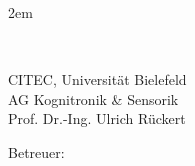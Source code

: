 \begin{titlepage}
\selectfont
\leftskip2em

\begin{minipage}[t]{0.4\textwidth}
\large \thesisType\\
\normalsize \thesisCourse
\end{minipage}
\hfill
\begin{minipage}[t]{0.4\textwidth}
\begin{flushright}
CITEC, Universität Bielefeld\\
AG Kognitronik \& Sensorik \\
Prof. Dr.-Ing. Ulrich Rückert     
\end{flushright}
\end{minipage}

\vfill

{\selectfont 
\Huge \thesisTitle
\begin{flushright}
\Large \thesisAuthor
\end{flushright}
}

\vfill

\normalsize

\begin{minipage}[t]{5em}
Betreuer:\quad
\end{minipage}
\begin{minipage}[t]{0.5\textwidth}
\thesisSupervisor
\end{minipage}




\vfill

\thesisDate
\hfill
\thesisId

\enlargethispage{2\baselineskip}

\end{titlepage}